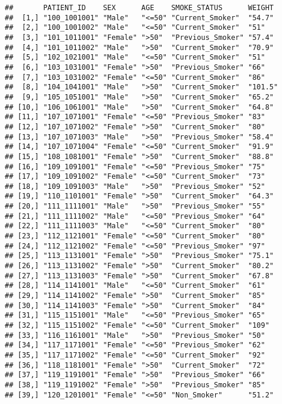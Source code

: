 \documentclass[
]{article}
\begin{document}
\begin{verbatim}
##       PATIENT_ID    SEX      AGE    SMOKE_STATUS      WEIGHT 
##  [1,] "100_1001001" "Male"   "<=50" "Current_Smoker"  "54.7" 
##  [2,] "100_1001002" "Male"   "<=50" "Current_Smoker"  "51"   
##  [3,] "101_1011001" "Female" ">50"  "Previous_Smoker" "57.4" 
##  [4,] "101_1011002" "Male"   ">50"  "Current_Smoker"  "70.9" 
##  [5,] "102_1021001" "Male"   "<=50" "Current_Smoker"  "51"   
##  [6,] "103_1031001" "Female" ">50"  "Previous_Smoker" "66"   
##  [7,] "103_1031002" "Female" "<=50" "Current_Smoker"  "86"   
##  [8,] "104_1041001" "Male"   ">50"  "Current_Smoker"  "101.5"
##  [9,] "105_1051001" "Male"   ">50"  "Current_Smoker"  "65.2" 
## [10,] "106_1061001" "Male"   ">50"  "Current_Smoker"  "64.8" 
## [11,] "107_1071001" "Female" "<=50" "Previous_Smoker" "83"   
## [12,] "107_1071002" "Female" ">50"  "Current_Smoker"  "80"   
## [13,] "107_1071003" "Male"   ">50"  "Previous_Smoker" "58.4" 
## [14,] "107_1071004" "Female" "<=50" "Current_Smoker"  "91.9" 
## [15,] "108_1081001" "Female" ">50"  "Current_Smoker"  "88.8" 
## [16,] "109_1091001" "Female" "<=50" "Previous_Smoker" "75"   
## [17,] "109_1091002" "Female" "<=50" "Current_Smoker"  "73"   
## [18,] "109_1091003" "Male"   ">50"  "Previous_Smoker" "52"   
## [19,] "110_1101001" "Female" ">50"  "Current_Smoker"  "64.3" 
## [20,] "111_1111001" "Male"   ">50"  "Previous_Smoker" "55"   
## [21,] "111_1111002" "Male"   "<=50" "Previous_Smoker" "64"   
## [22,] "111_1111003" "Male"   "<=50" "Current_Smoker"  "80"   
## [23,] "112_1121001" "Female" "<=50" "Current_Smoker"  "80"   
## [24,] "112_1121002" "Female" "<=50" "Previous_Smoker" "97"   
## [25,] "113_1131001" "Female" ">50"  "Previous_Smoker" "75.1" 
## [26,] "113_1131002" "Female" ">50"  "Current_Smoker"  "80.2" 
## [27,] "113_1131003" "Female" ">50"  "Current_Smoker"  "67.8" 
## [28,] "114_1141001" "Male"   "<=50" "Current_Smoker"  "61"   
## [29,] "114_1141002" "Female" ">50"  "Current_Smoker"  "85"   
## [30,] "114_1141003" "Female" ">50"  "Current_Smoker"  "84"   
## [31,] "115_1151001" "Male"   "<=50" "Previous_Smoker" "65"   
## [32,] "115_1151002" "Female" "<=50" "Current_Smoker"  "109"  
## [33,] "116_1161001" "Male"   ">50"  "Previous_Smoker" "50"   
## [34,] "117_1171001" "Female" "<=50" "Previous_Smoker" "62"   
## [35,] "117_1171002" "Female" "<=50" "Current_Smoker"  "92"   
## [36,] "118_1181001" "Female" ">50"  "Current_Smoker"  "72"   
## [37,] "119_1191001" "Female" ">50"  "Previous_Smoker" "66"   
## [38,] "119_1191002" "Female" ">50"  "Previous_Smoker" "85"   
## [39,] "120_1201001" "Female" "<=50" "Non_Smoker"      "51.2" 

\end{verbatim}
\end{document}
